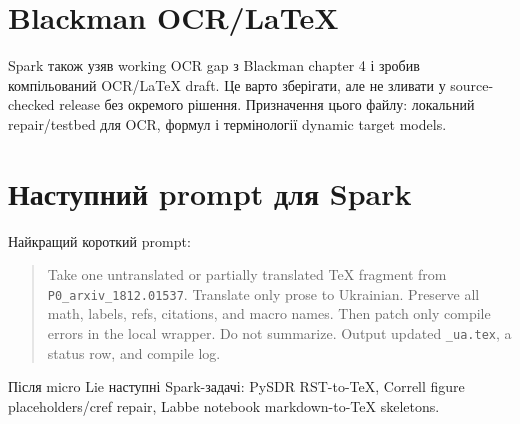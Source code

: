 \section{Blackman OCR/LaTeX}

Spark також узяв working OCR gap з Blackman chapter 4 і зробив компільований OCR/LaTeX draft. Це варто зберігати, але не зливати у source-checked release без окремого рішення. Призначення цього файлу: локальний repair/testbed для OCR, формул і термінології dynamic target models.

\section{Наступний prompt для Spark}

Найкращий короткий prompt:
\begin{quote}
Take one untranslated or partially translated TeX fragment from \texttt{P0\_arxiv\_1812.01537}. Translate only prose to Ukrainian. Preserve all math, labels, refs, citations, and macro names. Then patch only compile errors in the local wrapper. Do not summarize. Output updated \texttt{\_ua.tex}, a status row, and compile log.
\end{quote}

Після micro Lie наступні Spark-задачі: PySDR RST-to-TeX, Correll figure placeholders/cref repair, Labbe notebook markdown-to-TeX skeletons.


